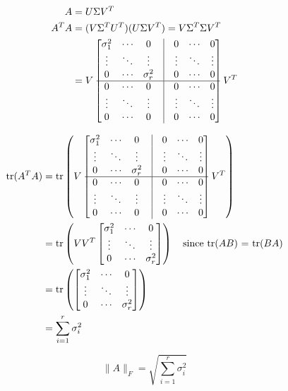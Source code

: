 \begin{derivation}
    \begin{align*}
        A &= U \Sigma V^T \\
        A^T A &= (V \Sigma^T U^T)(U \Sigma V^T) = V \Sigma^T \Sigma V^T \\
        &= V 
        \begin{bmatrix}
            \sigma_1^2 & \cdots & 0 & \vline & 0 & \cdots & 0 \\
            \vdots & \ddots & \vdots & \vline & \vdots & \ddots & \vdots \\
            0 & \cdots & \sigma_r^2 & \vline & 0 & \cdots & 0 \\
            \hline
            0 & \cdots & 0 & \vline & 0 & \cdots & 0 \\
            \vdots & \ddots & \vdots & \vline & \vdots & \ddots & \vdots \\
            0 & \cdots & 0 & \vline & 0 & \cdots & 0 
        \end{bmatrix} V^T
        \end{align*}
        
        \begin{align*}
        \text{tr}(A^T A) &= \text{tr} \left( V 
        \begin{bmatrix}
            \sigma_1^2 & \cdots & 0 & \vline & 0 & \cdots & 0 \\
            \vdots & \ddots & \vdots & \vline & \vdots & \ddots & \vdots \\
            0 & \cdots & \sigma_r^2 & \vline & 0 & \cdots & 0 \\
            \hline
            0 & \cdots & 0 & \vline & 0 & \cdots & 0 \\
            \vdots & \ddots & \vdots & \vline & \vdots & \ddots & \vdots \\
            0 & \cdots & 0 & \vline & 0 & \cdots & 0 
        \end{bmatrix} V^T \right) \\
        &= \text{tr} \left( 
            V V^T
            \begin{bmatrix}
                \sigma_1^2 & \cdots & 0 \\
                \vdots & \ddots & \vdots \\
                0 & \cdots & \sigma_r^2 
            \end{bmatrix} \right) \quad \text{since tr($AB$) = tr($BA$)}\\
        &= \text{tr} \left( 
        \begin{bmatrix}
            \sigma_1^2 & \cdots & 0 \\
            \vdots & \ddots & \vdots \\
            0 & \cdots & \sigma_r^2 
        \end{bmatrix} \right) \\
        &= \sum_{i=1}^{r} \sigma_i^2
        \end{align*}
        
        \begin{equation*}
        \|A\|_F = \sqrt{\sum_{i=1}^{r} \sigma_i^2}
        \end{equation*}
\end{derivation}

